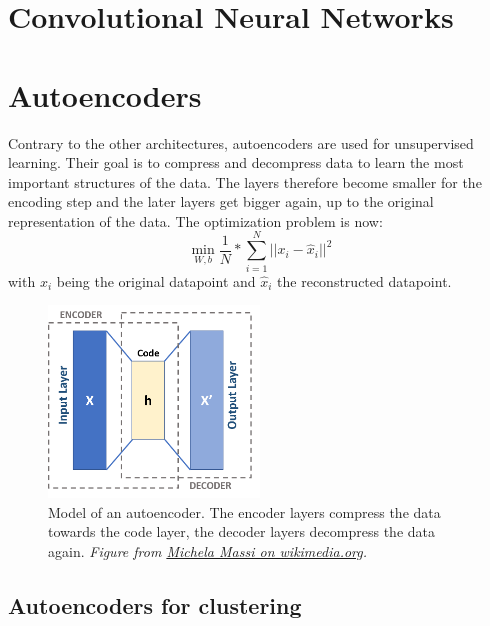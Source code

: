 \documentclass[
]{book}
\begin{document}
\hypertarget{convolutional-neural-networks}{%
\section{Convolutional Neural Networks}\label{convolutional-neural-networks}}

\hypertarget{autoencoders}{%
\section{Autoencoders}\label{autoencoders}}

Contrary to the other architectures, autoencoders are used for
unsupervised learning. Their goal is to compress and decompress data to
learn the most important structures of the data. The layers therefore
become smaller for the encoding step and the later layers get bigger
again, up to the original representation of the data. The optimization
problem is now:
\[\min_{W,b} \frac{1}{N}*\sum_{i=1}^N ||x_i - \hat{x}_i||^2\] with \(x_i\)
being the original datapoint and \(\hat{x}_i\) the reconstructed
datapoint.

\begin{figure}
\centering
\includegraphics[width=0.5\textwidth,height=\textheight]{./figures/Autoencoder_schema.png}
\caption{Model of an autoencoder. The encoder layers compress the data towards
the code layer, the decoder layers decompress the data again. \emph{Figure
from \href{https://commons.wikimedia.org/wiki/File:Autoencoder_schema.png}{Michela Massi on
wikimedia.org}.}}
\end{figure}

\hypertarget{autoencoders-for-clustering}{%
\subsection{Autoencoders for clustering}\label{autoencoders-for-clustering}}
\end{document}
